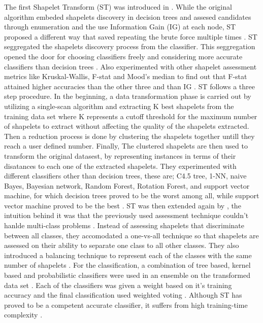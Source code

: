 The first Shapelet Transform (ST) was introduced in \cite{hills2014classification}.
While the original algorithm embeded shapelets discovery in decision trees and assesed candidates through enumeration and 
the use Information Gain (IG) at each node, ST proposed a different way that saved repeating the brute force multiple times \cite{bostrom2018shapelet}.
ST seggregated the shapelets discovery process from the classifier. This seggregation opened the door for choosing classifiers freely and considering more accurate
classifiers than decision trees \cite{bagnall2017great,lines2015time}. Also \cite{hills2014classification} experimented with other shapelet assessment metrics like Kruskal-Wallis, F-stat and Mood’s median
to find out that F-stat attained higher accuracies than the other three and than IG \cite{bostrom2018shapelet}.\newline
ST follows a three step procedure. In the beginning, a data transformation phase is carried out by utilizing a single-scan algorithm and extracting K best shapelets from the training
data set where K represents a cutoff threshold for the maximum number of shapelets to extract without affecting the quality of the shapelets extracted.
Then a reduction process is done by clustering the shapelets together untill they reach a user defined number.
Finally, The clustered shapelets are then used to transform the original datasest, by representing instances in terms of their disatances to each one of the extracted shapelets.
They experimented with different classifiers other than decision trees, these are; C4.5 tree, 1-NN, naive Bayes, Bayesian network, Random Forest, Rotation Forest, and support vector machine,
for which decision trees proved to be the worst among all, while support vector machine proved to be the best \cite{hills2014classification}.\newline
ST was then extended again by \cite{Bostrom2017}, the intuition behind it was that the previously used assessment technique couldn't hanlde multi-class problems \cite{Bostrom2017}.
Instead of assessing shapelets that discriminate between all classes, they accomodated a one-vs-all technique so that shapelets are assessed on their ability to separate one class to all other classes.
They also introduced a balancing technique to represent each of the classes with the same number of shapelets \cite{bagnall2017great}.
For the classification, a combination of tree based, kernel based and probabilistic classifiers were used in an ensemble on the transformed data set \cite{shifaz2020ts,lines2018time}.
Each of the classifiers was given a weight based on it's training accuracy and the final classification used weighted voting \cite{Bostrom2017}.
Although ST has proved to be a competent accurate classifier, it suffers from high training-time complexity \cite{shifaz2020ts}.
